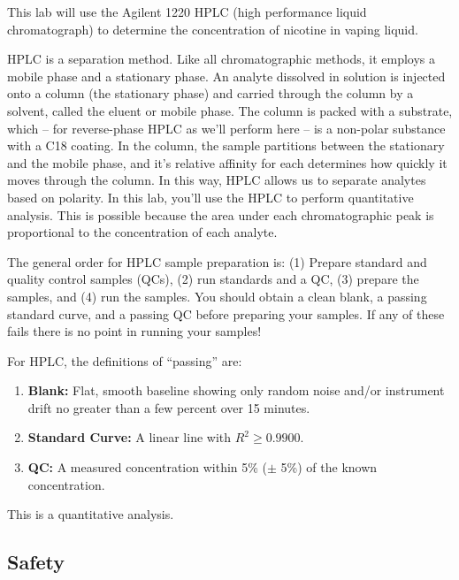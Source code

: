 \documentclass[]{tufte-book}
\providecommand{\tightlist}{%
  \setlength{\itemsep}{0pt}\setlength{\parskip}{0pt}}
\begin{document}
This lab will use the Agilent 1220 HPLC (high performance liquid chromatograph) to determine the concentration of nicotine in vaping liquid.

HPLC is a separation method. Like all chromatographic methods, it employs a mobile phase and a stationary phase. An analyte dissolved in solution is injected onto a column (the stationary phase) and carried through the column by a solvent, called the eluent or mobile phase. The column is packed with a substrate, which -- for reverse-phase HPLC as we'll perform here -- is a non-polar substance with a C18 coating. In the column, the sample partitions between the stationary and the mobile phase, and it's relative affinity for each determines how quickly it moves through the column. In this way, HPLC allows us to separate analytes based on polarity. In this lab, you'll use the HPLC to perform quantitative analysis. This is possible because the area under each chromatographic peak is proportional to the concentration of each analyte.

The general order for HPLC sample preparation is: (1) Prepare standard and quality control samples (QCs), (2) run standards and a QC, (3) prepare the samples, and (4) run the samples. You should obtain a clean blank, a passing standard curve, and a passing QC before preparing your samples. If any of these fails there is no point in running your samples!

For HPLC, the definitions of ``passing'' are:

\begin{enumerate}
\def\labelenumi{\arabic{enumi}.}
\tightlist
\item
  \textbf{Blank:} Flat, smooth baseline showing only random noise and/or instrument drift no greater than a few percent over 15 minutes.\\
\item
  \textbf{Standard Curve:} A linear line with \(R^2 \ge 0.9900\).\\
\item
  \textbf{QC:} A measured concentration within 5\% (\(\pm\) 5\%) of the known concentration.
\end{enumerate}

This is a quantitative analysis.

\hypertarget{safety-4}{%
\subsection*{Safety}\label{safety-4}}
\end{document}
